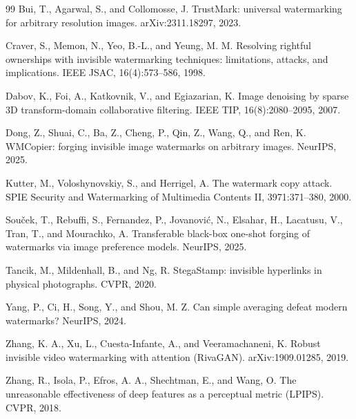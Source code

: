 \documentclass{article}
\begin{document}
\small
\begin{thebibliography}{99}
Bui, T., Agarwal, S., and Collomosse, J. TrustMark: universal watermarking for arbitrary resolution images. arXiv:2311.18297, 2023.

Craver, S., Memon, N., Yeo, B.-L., and Yeung, M. M. Resolving rightful ownerships with invisible watermarking techniques: limitations, attacks, and implications. IEEE JSAC, 16(4):573--586, 1998.

Dabov, K., Foi, A., Katkovnik, V., and Egiazarian, K. Image denoising by sparse 3D transform-domain collaborative filtering. IEEE TIP, 16(8):2080--2095, 2007.

Dong, Z., Shuai, C., Ba, Z., Cheng, P., Qin, Z., Wang, Q., and Ren, K. WMCopier: forging invisible image watermarks on arbitrary images. NeurIPS, 2025.

Kutter, M., Voloshynovskiy, S., and Herrigel, A. The watermark copy attack. SPIE Security and Watermarking of Multimedia Contents II, 3971:371--380, 2000.

Sou\v{c}ek, T., Rebuffi, S., Fernandez, P., Jovanovi\'c, N., Elsahar, H., Lacatusu, V., Tran, T., and Mourachko, A. Transferable black-box one-shot forging of watermarks via image preference models. NeurIPS, 2025.

Tancik, M., Mildenhall, B., and Ng, R. StegaStamp: invisible hyperlinks in physical photographs. CVPR, 2020.

Yang, P., Ci, H., Song, Y., and Shou, M. Z. Can simple averaging defeat modern watermarks? NeurIPS, 2024.

Zhang, K. A., Xu, L., Cuesta-Infante, A., and Veeramachaneni, K. Robust invisible video watermarking with attention (RivaGAN). arXiv:1909.01285, 2019.

Zhang, R., Isola, P., Efros, A. A., Shechtman, E., and Wang, O. The unreasonable effectiveness of deep features as a perceptual metric (LPIPS). CVPR, 2018.
\end{thebibliography}
\end{document}
